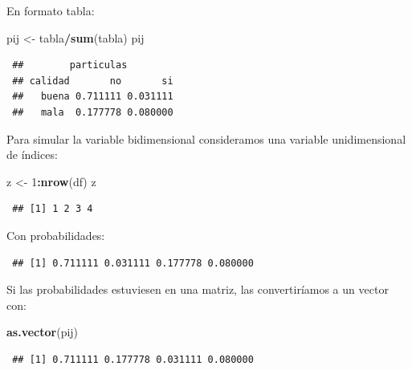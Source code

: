 \documentclass[
  spanish,
  10pt,
]{book}
\newenvironment{Shaded}{\begin{snugshade}}{\end{snugshade}}
\newcommand{\DecValTok}[1]{\textcolor[rgb]{0.00,0.00,0.81}{#1}}
\newcommand{\FunctionTok}[1]{\textcolor[rgb]{0.13,0.29,0.53}{\textbf{#1}}}
\newcommand{\NormalTok}[1]{#1}
\newcommand{\OtherTok}[1]{\textcolor[rgb]{0.56,0.35,0.01}{#1}}
\newcommand{\SpecialCharTok}[1]{\textcolor[rgb]{0.81,0.36,0.00}{\textbf{#1}}}
\theoremstyle{break}
\theoremstyle{nonumberplain}
\begin{document}
En formato tabla:

\begin{Shaded}
\begin{Highlighting}[]
\NormalTok{pij }\OtherTok{\textless{}{-}}\NormalTok{ tabla}\SpecialCharTok{/}\FunctionTok{sum}\NormalTok{(tabla)}
\NormalTok{pij}
\end{Highlighting}
\end{Shaded}

\begin{verbatim}
 ##        particulas
 ## calidad       no       si
 ##   buena 0.711111 0.031111
 ##   mala  0.177778 0.080000
\end{verbatim}

Para simular la variable bidimensional consideramos una variable unidimensional de índices:

\begin{Shaded}
\begin{Highlighting}[]
\NormalTok{z }\OtherTok{\textless{}{-}} \DecValTok{1}\SpecialCharTok{:}\FunctionTok{nrow}\NormalTok{(df)}
\NormalTok{z}
\end{Highlighting}
\end{Shaded}

\begin{verbatim}
 ## [1] 1 2 3 4
\end{verbatim}

Con probabilidades:

\begin{Shaded}
\end{Shaded}

\begin{verbatim}
 ## [1] 0.711111 0.031111 0.177778 0.080000
\end{verbatim}

Si las probabilidades estuviesen en una matriz, las convertiríamos a un vector con:

\begin{Shaded}
\begin{Highlighting}[]
\FunctionTok{as.vector}\NormalTok{(pij)}
\end{Highlighting}
\end{Shaded}

\begin{verbatim}
 ## [1] 0.711111 0.177778 0.031111 0.080000
\end{verbatim}
\end{document}
